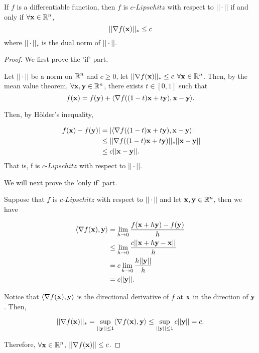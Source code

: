 \documentclass[../main.tex]{subfiles}
\begin{document}
\begin{claim}
	If $f$ is a differentiable function, then $f$ is $c$-$Lipschitz$ with respect to $||\cdot||$ if and only if $\forall \mathbf{x} \in \mathbb{R}^n$,
		\begin{equation}
	||\nabla f(\mathbf{x})||_* \leq c
	\end{equation}
	where $||\cdot||_*$ is the dual norm of $||\cdot||$.
\end{claim}
\begin{proof}
	We first prove the 'if' part.
	
	Let $||\cdot||$ be a norm on $\mathbb{R}^n$ and $c \geq 0$, let $||\nabla f(\mathbf{x})||_* \leq c $ $\forall \mathbf{x} \in \mathbb{R}^n$. Then, by the mean value theorem, $\forall \mathbf{x}, \mathbf{y} \in\mathbb{R}^n$, there exists $t\in [0,1]$ such that 
	\begin{equation*}
		f(\mathbf{x}) = f(\mathbf{y}) + \langle \nabla f((1-t) \mathbf{x} + t \mathbf{y}) , \mathbf{x} - \mathbf{y} \rangle.
	\end{equation*}
	
	Then, by H\"older's inequality, 
	
	\begin{equation*}
		\begin{aligned}
				|f(\mathbf{x}) - f(\mathbf{y})| & = |\langle \nabla f((1-t) \mathbf{x} + t \mathbf{y}) , \mathbf{x} - \mathbf{y} \rangle| \\
								  & \leq ||\nabla f((1-t) \mathbf{x} + t \mathbf{y})||_* ||\mathbf{x} - \mathbf{y}|| \\
								  & \leq c ||\mathbf{x} - \mathbf{y}||.
		\end{aligned}
	\end{equation*}
	That is, f is $c$-$Lipschitz$ with respect to $||\cdot||$.
	
	We will next prove the 'only if' part.
	
	Suppose that $f$ is $c$-$Lipschitz$ with respect to $||\cdot||$ and let $\mathbf{x}, \mathbf{y} \in \mathbb{R}^n$, then we have 
	
	\begin{equation*}
		\begin{aligned}
			\langle \nabla f(\mathbf{x}) , \mathbf{y} \rangle &= \lim\limits_{h \to 0} \frac{f(\mathbf{x} + h\mathbf{y}) - f(\mathbf{y})}{h} \\
												&\leq \lim\limits_{h \to 0} \frac{c||\mathbf{x} + h\mathbf{y} - \mathbf{x}||}{h} \\
												& = c \lim\limits_{h \to 0} \frac{h||\mathbf{y}||}{h} \\
												& = c||\mathbf{y}||.
		\end{aligned}
	\end{equation*}
	
	Notice that $\langle \nabla f(\mathbf{x}) , \mathbf{y} \rangle$ is the directional derivative of $f$ at $\mathbf{x}$ in the direction of $\mathbf{y}$. Then,
	
	\begin{equation*}
		||\nabla f(\mathbf{x})||_* = \sup\limits_{||\mathbf{y}||\leq 1} \langle \nabla f(\mathbf{x}) , \mathbf{y} \rangle \leq \sup\limits_{||\mathbf{y}||\leq 1}  c||\mathbf{y}|| = c.
	\end{equation*}
	
	Therefore, $\forall \mathbf{x} \in \mathbb{R}^n$, $||\nabla f(\mathbf{x})|| \leq c$.
\end{proof}
\end{document}

